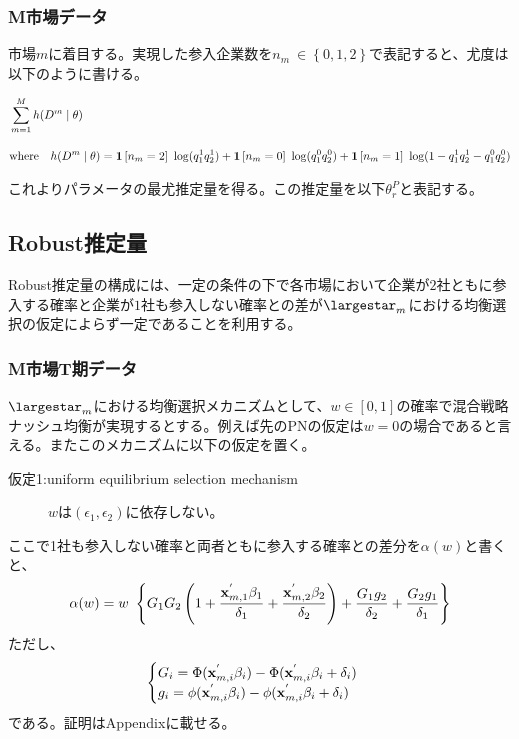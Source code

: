 \documentclass{jsarticle}
\begin{document}
\subsubsection{M市場データ}
市場$m$に着目する。実現した参入企業数を$n_m\ \in \left\{ 0,1,2 \right\}$で表記すると、尤度は以下のように書ける。

\begin{align*}
	&\sum_{m = 1}^M h(D^m \mid \theta)\\[10pt]
	&\text{where}\quad h(D^m \mid \theta) = {\bf 1}\left[ n_m = 2 \right]\ {\rm log} (q_1^1 q_2^1) + {\bf 1}\left[ n_m = 0 \right]\ {\rm log} (q_1^0 q_2^0) + {\bf 1}\left[ n_m = 1 \right]\ {\rm log} (1- q_1^1 q_2^1 - q_1^0 q_2^0)
\end{align*}

これよりパラメータの最尤推定量を得る。この推定量を以下$\theta_r^P$と表記する。


\subsection{Robust推定量}
Robust推定量の構成には、一定の条件の下で各市場において企業が$2$社ともに参入する確率と企業が$1$社も参入しない確率との差が$\largestar_m$における均衡選択の仮定によらず一定であることを利用する。

\subsubsection{M市場T期データ}
$\largestar_m$における均衡選択メカニズムとして、$w \in [0,1]$の確率で混合戦略ナッシュ均衡が実現するとする。例えば先のPNの仮定は$w = 0$の場合であると言える。またこのメカニズムに以下の仮定を置く。

\begin{description}
\item[仮定1:uniform equilibrium selection mechanism] $w$は$(\epsilon_1, \epsilon_2)$に依存しない。
\end{description}

ここで1社も参入しない確率と両者ともに参入する確率との差分を$\alpha(w)$と書くと、
\begin{align*}
	\alpha(w) = w\ \left\{ G_1 G_2 \left( 1 + \frac{{\bf x}_{m, 1}^{'} \beta_1}{\delta_1} + \frac{{\bf x}_{m, 2}^{'} \beta_2}{\delta_2} \right) + \frac{G_1g_2}{\delta_2} + \frac{G_2g_1}{\delta_1} \right\}
\end{align*}
ただし、
\begin{align*}
\begin{cases}
	G_i =  \Phi({\bf x}_{m, i}^{'} \beta_i) - \Phi({\bf x}_{m, i}^{'} \beta_i  + \delta_i)\\
	g_i = \phi({\bf x}_{m, i}^{'} \beta_i) - \phi({\bf x}_{m, i}^{'} \beta_i  + \delta_i)
\end{cases}
\end{align*}
である。証明はAppendixに載せる。
\end{document}

